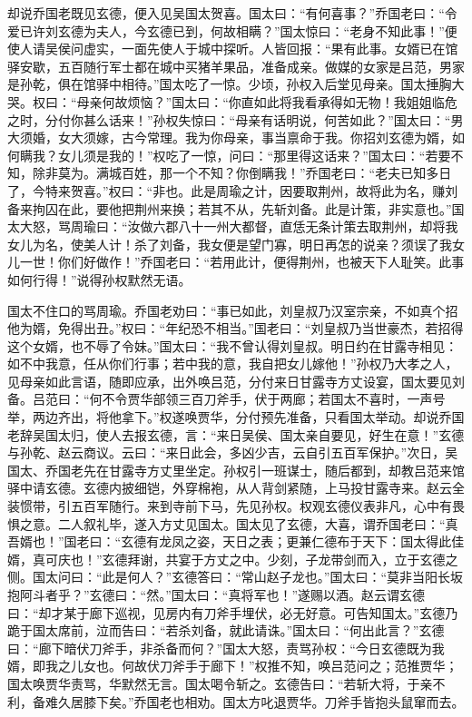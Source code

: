 却说乔国老既见玄德，便入见吴国太贺喜。国太曰：“有何喜事？”乔国老曰：“令爱已许刘玄德为夫人，今玄德已到，何故相瞒？”国太惊曰：“老身不知此事！”便使人请吴侯问虚实，一面先使人于城中探听。人皆回报：“果有此事。女婿已在馆驿安歇，五百随行军士都在城中买猪羊果品，准备成亲。做媒的女家是吕范，男家是孙乾，俱在馆驿中相待。”国太吃了一惊。少顷，孙权入后堂见母亲。国太捶胸大哭。权曰：“母亲何故烦恼？”国太曰：“你直如此将我看承得如无物！我姐姐临危之时，分付你甚么话来！”孙权失惊曰：“母亲有话明说，何苦如此？”国太曰：“男大须婚，女大须嫁，古今常理。我为你母亲，事当禀命于我。你招刘玄德为婿，如何瞒我？女儿须是我的！”权吃了一惊，问曰：“那里得这话来？”国太曰：“若要不知，除非莫为。满城百姓，那一个不知？你倒瞒我！”乔国老曰：“老夫已知多日了，今特来贺喜。”权曰：“非也。此是周瑜之计，因要取荆州，故将此为名，赚刘备来拘囚在此，要他把荆州来换；若其不从，先斩刘备。此是计策，非实意也。”国太大怒，骂周瑜曰：“汝做六郡八十一州大都督，直恁无条计策去取荆州，却将我女儿为名，使美人计！杀了刘备，我女便是望门寡，明日再怎的说亲？须误了我女儿一世！你们好做作！”乔国老曰：“若用此计，便得荆州，也被天下人耻笑。此事如何行得！”说得孙权默然无语。

国太不住口的骂周瑜。乔国老劝曰：“事已如此，刘皇叔乃汉室宗亲，不如真个招他为婿，免得出丑。”权曰：“年纪恐不相当。”国老曰：“刘皇叔乃当世豪杰，若招得这个女婿，也不辱了令妹。”国太曰：“我不曾认得刘皇叔。明日约在甘露寺相见：如不中我意，任从你们行事；若中我的意，我自把女儿嫁他！”孙权乃大孝之人，见母亲如此言语，随即应承，出外唤吕范，分付来日甘露寺方丈设宴，国太要见刘备。吕范曰：“何不令贾华部领三百刀斧手，伏于两廊；若国太不喜时，一声号举，两边齐出，将他拿下。”权遂唤贾华，分付预先准备，只看国太举动。却说乔国老辞吴国太归，使人去报玄德，言：“来日吴侯、国太亲自要见，好生在意！”玄德与孙乾、赵云商议。云曰：“来日此会，多凶少吉，云自引五百军保护。”次日，吴国太、乔国老先在甘露寺方丈里坐定。孙权引一班谋士，随后都到，却教吕范来馆驿中请玄德。玄德内披细铠，外穿棉袍，从人背剑紧随，上马投甘露寺来。赵云全装惯带，引五百军随行。来到寺前下马，先见孙权。权观玄德仪表非凡，心中有畏惧之意。二人叙礼毕，遂入方丈见国太。国太见了玄德，大喜，谓乔国老曰：“真吾婿也！”国老曰：“玄德有龙凤之姿，天日之表；更兼仁德布于天下：国太得此佳婿，真可庆也！”玄德拜谢，共宴于方丈之中。少刻，子龙带剑而入，立于玄德之侧。国太问曰：“此是何人？”玄德答曰：“常山赵子龙也。”国太曰：“莫非当阳长坂抱阿斗者乎？”玄德曰：“然。”国太曰：“真将军也！”遂赐以酒。赵云谓玄德曰：“却才某于廊下巡视，见房内有刀斧手埋伏，必无好意。可告知国太。”玄德乃跪于国太席前，泣而告曰：“若杀刘备，就此请诛。”国太曰：“何出此言？”玄德曰：“廊下暗伏刀斧手，非杀备而何？”国太大怒，责骂孙权：“今日玄德既为我婿，即我之儿女也。何故伏刀斧手于廊下！”权推不知，唤吕范问之；范推贾华；国太唤贾华责骂，华默然无言。国太喝令斩之。玄德告曰：“若斩大将，于亲不利，备难久居膝下矣。”乔国老也相劝。国太方叱退贾华。刀斧手皆抱头鼠窜而去。

